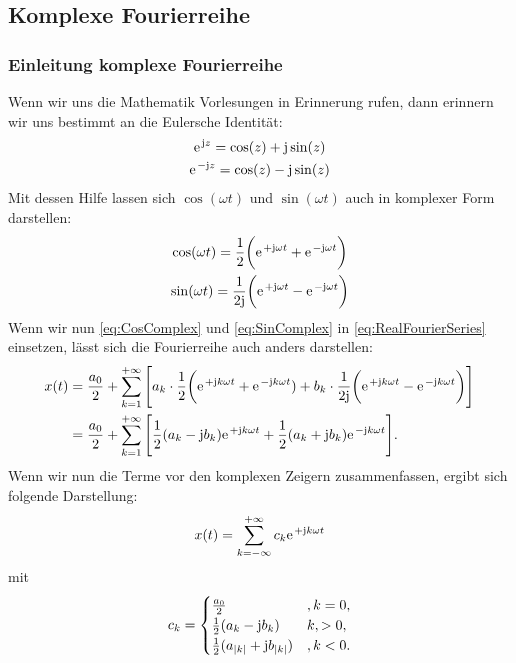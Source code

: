 \documentclass[11pt,a4paper,DIV=12]{scrartcl}
\begin{document}
\subsection*{Komplexe Fourierreihe}
\subsubsection*{Einleitung komplexe Fourierreihe}
Wenn wir uns die Mathematik Vorlesungen in Erinnerung rufen, dann erinnern wir uns bestimmt an die Eulersche Identität:
\begin{gather}
	\label{eq:EulerIdentity}
	\e^{\im z}=\cos(z)+\im\sin(z)\\
	\label{eq:ConjugatedEulerIdenity}
	\e^{-\im z}=\cos(z)-\im\sin(z)
\end{gather}
Mit dessen Hilfe lassen sich $\cos(\omega t)$ und $\sin(\omega t)$ auch in komplexer Form darstellen:
\begin{gather}
	\label{eq:CosComplex}
	\cos(\omega t)=\frac{1}{2}\bigg (\e^{+\im\omega t}+\e^{-\im\omega t}\bigg)\\
	\label{eq:SinComplex}
	\sin(\omega t)=\frac{1}{2\im}\bigg (\e^{+\im\omega t}-\e^{-\im\omega t}\bigg )
\end{gather}
Wenn wir nun \eqref{eq:CosComplex} und \eqref{eq:SinComplex} in \eqref{eq:RealFourierSeries} einsetzen, lässt sich die Fourierreihe auch anders darstellen:
\begin{align}
	x(t)&=\frac{a_0}{2}+\sum_{k=1}^{+\infty}\Bigg [a_k\cdot\frac{1}{2}\bigg (\e^{+\im k \omega t}+\e^{-\im k \omega t})+b_k\cdot\frac{1}{2\im}\bigg (\e^{+\im k \omega t}-\e^{-\im k \omega t}\bigg )\Bigg ]\\
	&=\frac{a_0}{2}+\sum_{k=1}^{+\infty}\Bigg [\frac{1}{2}(a_k-\im b_k)\e^{+\im k \omega t}+\frac{1}{2}(a_k+\im b_k)\e^{-\im k \omega t}\Bigg ].
\end{align}
Wenn wir nun die Terme vor den komplexen Zeigern zusammenfassen, ergibt sich folgende Darstellung:
\begin{align}
	x(t)=\sum_{k=-\infty}^{+\infty}c_k\e^{+\im k \omega t}
\end{align}
mit
\begin{align}
	\label{eq:ComplexRealCoeffConnection}
	c_k=\begin{cases}
		\frac{a_0}{2} &,k=0 ,\\
		\frac{1}{2}(a_k-\im b_k) &k,>0,\\
		\frac{1}{2}(a_{|k|}+\im b_{|k|}) &,k<0.
	\end{cases}
\end{align}
\end{document}
